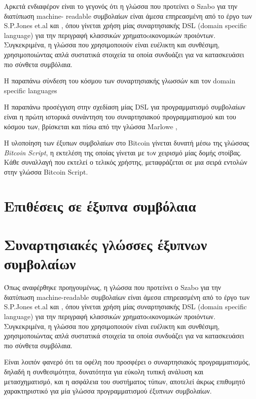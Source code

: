    Αρκετά ενδιαφέρον είναι το γεγονός ότι η γλώσσα που προτείνει ο Szabo για την διατύπωση machine-
   readable συμβολαίων είναι άμεσα επηρεασμένη από το έργο των S.P.Jones et.al \cite{composingcontracts}
    και \cite{howtowriteacontract}, όπου γίνεται χρήση μίας συναρτησιακής DSL (domain specific language) για την περιγραφή κλασσικών χρηματοoικονομικών προιόντων. Συγκεκριμένα, η γλώσσα που χρησιμοποιούν
    είναι ευέλικτη και συνθέσιμη, χρησιμοποιώντας απλά συστατικά στοιχεία τα οποία συνδυάζει για να κατασκευάσει πιο σύνθετα συμβόλαια.

    Η παραπάνω σύνδεση του κόσμου των συναρτησιακής γλωσσών και τον domain specific languages 


     Η παραπάνω προσέγγιση στην σχεδίαση μίας DSL για προγραμματισμό συμβολαίων είναι η πρώτη ιστορικά
      συνάντηση του συναρτησιακού προγραμματισμού και του κόσμου των, βρίσκεται και πίσω 
        από την γλώσσα Marlowe \cite{Marlowe},

              
              Η υλοποίηση των έξυπων συμβολαίων στο Bitcoin γίνεται δυνατή μέσω της γλώσσας 
              \textit{Bitcoin Script}, η εκτελέση της οποίας γίνεται με τoν χειρισμό μίας δομής στοίβας. Κάθε
              συναλλαγή που εκτελεί ο τελικός χρήστης, μεταφράζεται σε μια σειρά εντολών στην γλώσσα
              Bitcoin Script. 


\section{Επιθέσεις σε έξυπνα συμβόλαια} 


\section{Συναρτησιακές γλώσσες έξυπνων συμβολαίων} \label{dsls}


Όπως αναφέρθηκε προηγουμένως,  η γλώσσα που προτείνει ο Szabo για την διατύπωση machine-readable συμβολαίων είναι άμεσα επηρεασμένη από το έργο των S.P.Jones et.al 
\cite{composingcontracts}  και \cite{howtowriteacontract}, όπου γίνεται χρήση μίας συναρτησιακής DSL
 (domain specific language) για την περιγραφή κλασσικών χρηματοoικονομικών προιόντων. Συγκεκριμένα, η
   γλώσσα που χρησιμοποιούν είναι ευέλικτη και συνθέσιμη, χρησιμοποιώντας απλά συστατικά στοιχεία τα
     οποία συνδυάζει για να κατασκευάσει πιο σύνθετα συμβόλαια. 
       
         Είναι λοιπόν φανερό ότι τα οφέλη που προσφέρει ο συναρτησιακός προγραμματισμός, δηλαδή η 
           συνθεσιμότητα, δυνατότητα για εύκολη τυπική ανάλυση και μετασχηματισμό, και η ασφάλεια του
             συστήματος τύπων, αποτελεί άκρως επιθυμητό χαρακτηριστικό για μία γλώσσα προγραμματισμού
               έξυπνων συμβολαίων.
                 
